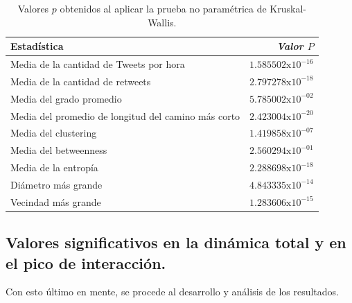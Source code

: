 \documentclass[../main.tex]{subfiles}
\begin{document}
\begin{table}[h!]
    \centering
    \caption{Valores $p$ obtenidos al aplicar la prueba no paramétrica de Kruskal-Wallis. }
    \begin{tabular}{lr}
\toprule
      Estadística  &       \textit{Valor $P$} \\
\midrule
     Media de la cantidad de Tweets por hora  &  $1.585502\text{x}10^{-16}$ \\
   Media de la cantidad de retweets &  $2.797278\text{x}10^{-18} $\\
    Media del grado promedio &  \textbf{$5.785002\text{x}10^{-02}$} \\
    Media del promedio de longitud del camino más corto   &  $2.423004\text{x}10^{-20}$ \\
  Media del clustering &  $1.419858\text{x}10^{-07}$ \\
 Media del betweenness &  \textbf{$2.560294\text{x}10^{-01}$} \\
     Media de la entropía &  $2.288698\text{x} 10^{-18}$ \\
     Diámetro más grande &  $4.843335\text{x} 10^{-14}$ \\
        Vecindad más grande &  $1.283606\text{x} 10^{-15}$ \\
\bottomrule
\end{tabular}
    \label{tab:resultados_diferenciasDeTendencias}
\end{table}


\subsection{ Valores significativos en la dinámica total y en el pico de interacción.  }




Con esto último en mente, se procede al desarrollo y análisis de los resultados.
\end{document}
